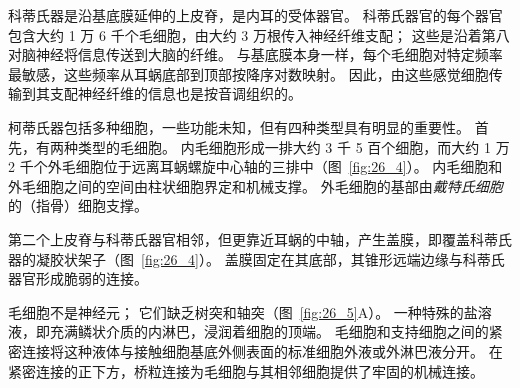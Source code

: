 科蒂氏器是沿基底膜延伸的上皮脊，是内耳的受体器官。
科蒂氏器官的每个器官包含大约 1 万 6 千个毛细胞，由大约 3 万根传入神经纤维支配；
这些是沿着第八对脑神经将信息传送到大脑的纤维。
与基底膜本身一样，每个毛细胞对特定频率最敏感，这些频率从耳蜗底部到顶部按降序对数映射。
因此，由这些感觉细胞传输到其支配神经纤维的信息也是按音调组织的。


柯蒂氏器包括多种细胞，一些功能未知，但有四种类型具有明显的重要性。
首先，有两种类型的毛细胞。
内毛细胞形成一排大约 3 千 5 百个细胞，而大约 1 万 2 千个外毛细胞位于远离耳蜗螺旋中心轴的三排中（图~\ref{fig:26_4}）。
内毛细胞和外毛细胞之间的空间由柱状细胞界定和机械支撑。
外毛细胞的基部由\textit{戴特氏细胞}的（指骨）细胞支撑。


第二个上皮脊与科蒂氏器官相邻，但更靠近耳蜗的中轴，产生盖膜，即覆盖科蒂氏器的凝胶状架子（图~\ref{fig:26_4}）。
盖膜固定在其底部，其锥形远端边缘与科蒂氏器官形成脆弱的连接。


毛细胞不是神经元； 它们缺乏树突和轴突（图~\ref{fig:26_5}A）。
一种特殊的盐溶液，即充满鳞状介质的内淋巴，浸润着细胞的顶端。
毛细胞和支持细胞之间的紧密连接将这种液体与接触细胞基底外侧表面的标准细胞外液或外淋巴液分开。
在紧密连接的正下方，桥粒连接为毛细胞与其相邻细胞提供了牢固的机械连接。


